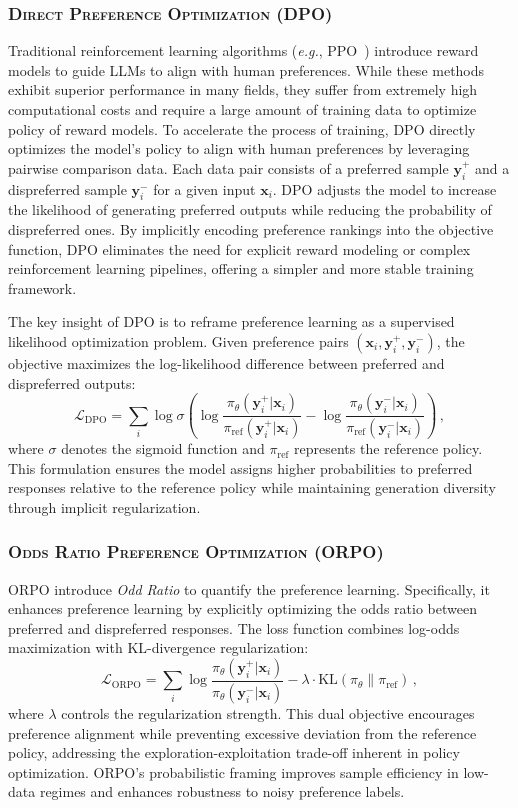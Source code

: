 \subsubsection{\textsc{Direct Preference Optimization (DPO)}}

Traditional reinforcement learning algorithms (\emph{e.g.}, PPO~\cite{schulman2017ppo}) introduce reward models to guide LLMs to align with human preferences. While these methods exhibit superior performance in many fields, they suffer from extremely high computational costs and require a large amount of training data to optimize policy of reward models. To accelerate the process of training, DPO directly optimizes the model's policy to align with human preferences by leveraging pairwise comparison data. Each data pair consists of a preferred sample $\mathbf{y}_i^+$ and a dispreferred sample $\mathbf{y}_i^-$ for a given input $\mathbf{x}_i$. DPO adjusts the model to increase the likelihood of generating preferred outputs while reducing the probability of dispreferred ones. By implicitly encoding preference rankings into the objective function, DPO eliminates the need for explicit reward modeling or complex reinforcement learning pipelines, offering a simpler and more stable training framework.

The key insight of DPO is to reframe preference learning as a supervised likelihood optimization problem. Given preference pairs $(\mathbf{x}_i, \mathbf{y}_i^+, \mathbf{y}_i^-)$, the objective maximizes the log-likelihood difference between preferred and dispreferred outputs:
\[
\mathcal{L}_{\text{DPO}} = \sum_{i} \log \sigma\left(\log \frac{\pi_\theta(\mathbf{y}_i^+|\mathbf{x}_i)}{\pi_{\text{ref}}(\mathbf{y}_i^+|\mathbf{x}_i)} - \log \frac{\pi_\theta(\mathbf{y}_i^-|\mathbf{x}_i)}{\pi_{\text{ref}}(\mathbf{y}_i^-|\mathbf{x}_i)}\right)\,,
\]
where $\sigma$ denotes the sigmoid function and $\pi_{\text{ref}}$ represents the reference policy. This formulation ensures the model assigns higher probabilities to preferred responses relative to the reference policy while maintaining generation diversity through implicit regularization.

\subsubsection{\textsc{Odds Ratio Preference Optimization (ORPO)}}
ORPO introduce \textit{Odd Ratio} to quantify the preference learning. Specifically, it enhances preference learning by explicitly optimizing the odds ratio between preferred and dispreferred responses. The loss function combines log-odds maximization with KL-divergence regularization:
\[
\mathcal{L}_{\text{ORPO}} = \sum_{i} \log \frac{\pi_\theta(\mathbf{y}_i^+|\mathbf{x}_i)}{\pi_\theta(\mathbf{y}_i^-|\mathbf{x}_i)} - \lambda \cdot \text{KL}\left(\pi_\theta \| \pi_{\text{ref}}\right)\,,
\]
where $\lambda$ controls the regularization strength. This dual objective encourages preference alignment while preventing excessive deviation from the reference policy, addressing the exploration-exploitation trade-off inherent in policy optimization. ORPO's probabilistic framing improves sample efficiency in low-data regimes and enhances robustness to noisy preference labels.

